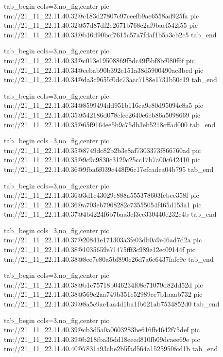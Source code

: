  
 
 
 
 

\qqSecCmtScr


\ifcmt
  tab_begin cols=3,no_fig,center
    pic tm://21_11_22.11.40.32@c183d27807c97ceefb9ae6558ad925fa
    pic tm://21_11_22.11.40.32@57d87df2e2671b768c2af9baef542f55
    pic tm://21_11_22.11.40.33@b16d90bcf7615c57a7fdaf1b5a3cb2c5
  tab_end
\fi


\ifcmt
  tab_begin cols=3,no_fig,center
    pic tm://21_11_22.11.40.33@c013e19508869f8dc49f5bf8bf080f6f
    pic tm://21_11_22.11.40.34@cebab90b392e151a38d5900490ac3bcd
    pic tm://21_11_22.11.40.34@da3c9655f0dc73acc7188e1731b50c19
  tab_end
\fi


\ifcmt
  tab_begin cols=3,no_fig,center
    pic tm://21_11_22.11.40.34@8599494dd951b116ea9e80d95094c8a5
    pic tm://21_11_22.11.40.35@542186d078cfee2640e6eb86a5098669
    pic tm://21_11_22.11.40.35@65f9164ee5b9c75db3eb5218cffad000
  tab_end
\fi


\ifcmt
  tab_begin cols=3,no_fig,center
    pic tm://21_11_22.11.40.35@8749dc82b2b3e8af7303373f866760ad
    pic tm://21_11_22.11.40.35@9c9c9830c3129c25cc17b7a00c642410
    pic tm://21_11_22.11.40.36@9fba6f039c448f96c17efcadea04b795
  tab_end
\fi


\ifcmt
  tab_begin cols=3,no_fig,center
    pic tm://21_11_22.11.40.36@3d1c43029e888a555378603febee358f
    pic tm://21_11_22.11.40.36@a703eb7968282c73555054f465d153a1
    pic tm://21_11_22.11.40.37@4b4224f6b7baa3cf3ce330440e232c4b
  tab_end
\fi


\ifcmt
  tab_begin cols=3,no_fig,center
    pic tm://21_11_22.11.40.37@20841e171303a3fe03db0a9e46ad7d2a
    pic tm://21_11_22.11.40.38@1035659e71475fff3c989e12ec09144f
    pic tm://21_11_22.11.40.38@8ee7e80a5bf890c26d7a6e6437fafc9c
  tab_end
\fi


\ifcmt
  tab_begin cols=3,no_fig,center
    pic tm://21_11_22.11.40.38@b1c75718b046234f08e71079d82dd52d
    pic tm://21_11_22.11.40.38@569e2aa749b351e52989ce7b1aaab732
    pic tm://21_11_22.11.40.39@8a5c9ae1aa4d1ba1fb621ab7534852d0
  tab_end
\fi


\ifcmt
  tab_begin cols=3,no_fig,center
    pic tm://21_11_22.11.40.39@cb3d5a0a0603283be616fb4642f75def
    pic tm://21_11_22.11.40.39@b218fba36dd18eeed810fb09dcaee69e
    pic tm://21_11_22.11.40.40@7831a93cbe2b5fad564a1525950fcd1b
  tab_end
\fi

